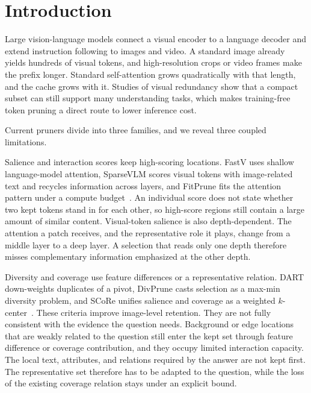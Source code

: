\section{Introduction}
\label{sec:intro}

Large vision-language models connect a visual encoder to a language decoder and extend instruction following to images and video. A standard image already yields hundreds of visual tokens, and high-resolution crops or video frames make the prefix longer. Standard self-attention grows quadratically with that length, and the cache grows with it. Studies of visual redundancy show that a compact subset can still support many understanding tasks, which makes training-free token pruning a direct route to lower inference cost.

Current pruners divide into three families, and we reveal three coupled limitations.

Salience and interaction scores keep high-scoring locations. FastV uses shallow language-model attention, SparseVLM scores visual tokens with image-related text and recycles information across layers, and FitPrune fits the attention pattern under a compute budget~\cite{fastv,sparsevlm,fitprune}. An individual score does not state whether two kept tokens stand in for each other, so high-score regions still contain a large amount of similar content. Visual-token salience is also depth-dependent. The attention a patch receives, and the representative role it plays, change from a middle layer to a deep layer. A selection that reads only one depth therefore misses complementary information emphasized at the other depth.

Diversity and coverage use feature differences or a representative relation. DART down-weights duplicates of a pivot, DivPrune casts selection as a max-min diversity problem, and SCoRe unifies salience and coverage as a weighted $k$-center~\cite{dart,divprune,score}. These criteria improve image-level retention. They are not fully consistent with the evidence the question needs. Background or edge locations that are weakly related to the question still enter the kept set through feature difference or coverage contribution, and they occupy limited interaction capacity. The local text, attributes, and relations required by the answer are not kept first. The representative set therefore has to be adapted to the question, while the loss of the existing coverage relation stays under an explicit bound.

